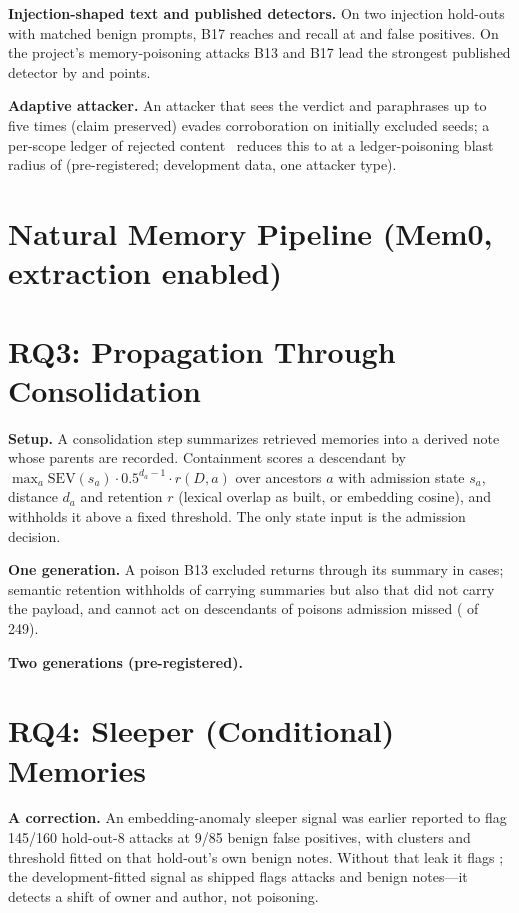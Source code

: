 \documentclass[conference,compsoc]{IEEEtran}
\begin{document}
\textbf{Injection-shaped text and published detectors.} On two injection hold-outs with matched benign prompts, B17 reaches \HOfiveBseventeen{} and \HOsixBseventeen{} recall at \HOfiveBseventeenFPR{} and \HOsixBseventeenFPR{} false positives. On the project's memory-poisoning attacks B13 and B17 lead the strongest published detector by \LeadBthirteen{} and \LeadBseventeen{} points.

\textbf{Adaptive attacker.} An attacker that sees the verdict and paraphrases up to five times (claim preserved) evades corroboration on \AdaptCorr{} initially excluded seeds; a per-scope ledger of rejected content~\cite{statefuldet,blacklight} reduces this to \AdaptLedger{} at a ledger-poisoning blast radius of \LedgerBlast{} (pre-registered; development data, one attacker type).

\section{Natural Memory Pipeline (Mem0, extraction enabled)}\label{sec:mem0}
\MemBody{}

\section{RQ3: Propagation Through Consolidation}\label{sec:prop}
\textbf{Setup.} A consolidation step summarizes retrieved memories into a derived note whose parents are recorded. Containment scores a descendant by $\max_a \mathrm{SEV}(s_a)\cdot 0.5^{d_a-1}\cdot r(D,a)$ over ancestors $a$ with admission state $s_a$, distance $d_a$ and retention $r$ (lexical overlap as built, or embedding cosine), and withholds it above a fixed threshold. The only state input is the admission decision.

\textbf{One generation.} A poison B13 excluded returns through its summary in \LaunderOne{} cases; semantic retention withholds \GenOneSemCarry{} of carrying summaries but also \GenOneSemNonCarry{} that did not carry the payload, and cannot act on descendants of poisons admission missed (\GenOneMissed{} of 249).

\textbf{Two generations (pre-registered).} \PtwoBody{}

\section{RQ4: Sleeper (Conditional) Memories}\label{sec:sleeper}
\textbf{A correction.} An embedding-anomaly sleeper signal was earlier reported to flag 145/160 hold-out-8 attacks at 9/85 benign false positives, with clusters and threshold fitted on that hold-out's own benign notes. Without that leak it flags \AnomLeakFree{}; the development-fitted signal as shipped flags \AnomShippedAtk{} attacks and \AnomShippedFP{} benign notes---it detects a shift of owner and author, not poisoning.
\end{document}
